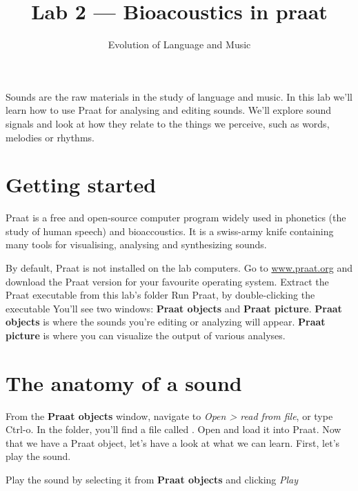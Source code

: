 \documentclass[a4paper, 9pt]{article}
\title{Lab 2 --- Bioacoustics in praat}
\author{Evolution of Language and Music}
\begin{document}
\maketitle

\begin{goals}
Sounds are the raw materials in the study of language and music. In this
lab we'll learn how to use Praat for analysing and editing sounds. We'll
explore sound signals and look at how they relate to the things we
perceive, such as words, melodies or rhythms.
\end{goals}

\section{Getting started}\label{getting-started}

Praat is a free and open-source computer program widely used in
phonetics (the study of human speech) and bioaccoustics. It is a
swiss-army knife containing many tools for visualising, analysing and
synthesizing sounds.

\begin{exercise}
  \action By default, Praat is not installed on the lab computers. Go to 
  \url{www.praat.org} and download the Praat version for your favourite 
  operating system.
  \action Extract the Praat executable from this lab's folder
  \action Run Praat, by double-clicking the executable
  \action You'll see two windows: \textbf{Praat objects} and \textbf{Praat
  picture}. \textbf{Praat objects} is where the sounds you're editing or
  analyzing will appear. \textbf{Praat picture} is where you can visualize
  the output of various analyses.
\end{exercise}


\section{The anatomy of a sound}\label{the-anatomy-of-a-sound}

From the \textbf{Praat objects} window, navigate to \emph{Open
> read from file}, or type Ctrl-o. In the 
folder, you'll find a file called . Open and load it into
Praat. Now that we have a Praat object, let's have a look at what we can
learn. First, let's play the sound.

\begin{exercise}
\action Play the sound by selecting it from \textbf{Praat objects} and clicking \textit{Play}
\end{exercise}
\end{document}
